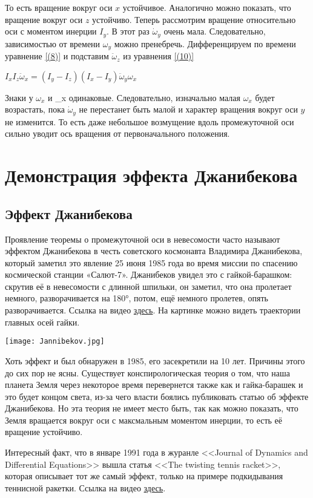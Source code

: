 \documentclass{article}
\begin{document}
То есть вращение вокруг оси $x$ устойчивое. Аналогично можно показать, что вращение вокруг оси $z$ устойчиво. 
Теперь рассмотрим вращение относительно оси с моментом инерции $I_y$. В этот раз $\displaystyle {\dot {\omega }}_{y}$ очень мала. Следовательно, зависимостью от времени
$\omega_y$ можно пренебречь. Дифференцируем по времени уравнение \ref{(8)} и подставим $\displaystyle {\ddot {\omega }}_{z}$ из уравнения \ref{(10)}

\begin{center}
$I_xI_z{\displaystyle {\ddot {\omega }}_{x}} = (I_y-I_z)(I_x-I_y){\displaystyle {\ddot {\omega }}_{y}}\omega_x$
\end{center}

Знаки у $\omega_x$ и {\displaystyle {\ddot {\omega }}_{x}} одинаковые. Следовательно, изначально малая $\omega_x$ будет возрастать, пока $\displaystyle {\dot {\omega }}_{y}$ не перестанет быть малой и характер вращения вокруг оси $y$ не изменится. То есть даже небольшое возмущение вдоль промежуточной оси сильно уводит ось вращения от первоначального положения. 

\section{Демонстрация эффекта Джанибекова}
\subsection{Эффект Джанибекова}
Проявление теоремы о промежуточной оси в невесомости часто называют эффектом Джанибекова в честь советского космонавта Владимира Джанибекова, который заметил это явление 25 июня 1985 года во время миссии по спасению космической станции «Салют-7». Джанибеков увидел это с гайкой-барашком: скрутив её в невесомости с длинной шпильки, он заметил, что она пролетает немного, разворачивается на 180°, потом, ещё немного пролетев, опять разворачивается. Ссылка на видео \href{https://github.com/sevaphasol/vpv-mechanics/blob/main/%D0%AD%D1%84%D1%84%D0%B5%D0%BA%D1%82%20%D0%94%D0%B6%D0%B0%D0%BD%D0%BD%D0%B8%D0%B1%D0%B5%D0%BA%D0%BE%D0%B2%D0%B0.mp4}{здесь}. На картинке можно видеть траектории главных осей гайки.
\begin{center}
\texttt{[image: Jannibekov.jpg]}
\end{center}
\par
Хоть эффект и был обнаружен в 1985, его засекретили на 10 лет. Причины этого до сих пор не ясны. Существует конспирологическая теория о том, что наша планета Земля через некоторое время перевернется также как и гайка-барашек и это будет концом света, из-за чего власти боялись публиковать статью об эффекте Джанибекова.  Но эта теория не имеет место быть, так как можно показать, что Земля вращается вокруг оси с максмальным моментом инерции, то есть её вращение устойчиво.
\par
Интересный факт, что в январе 1991 года в журанле <<Journal of Dynamics and Differential Equations>> вышла статья <<The twisting tennis racket>>, которая описывает тот же самый эффект, только на примере подкидывания теннисной ракетки. Ссылка на видео \href{https://github.com/sevaphasol/vpv-mechanics/blob/main/%D0%A2%D0%B5%D0%BD%D0%BD%D0%B8%D1%81%D0%BD%D0%B0%D1%8F%20%D1%80%D0%B0%D0%BA%D0%B5%D1%82%D0%BA%D0%B0.mp4}{здесь}.
\end{document}
